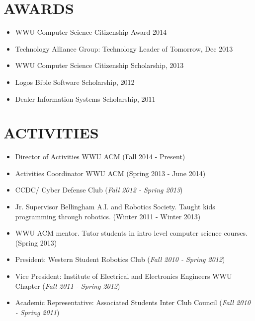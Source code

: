 \documentclass[line,margin]{res}
\begin{document}
\begin{resume}
\section{AWARDS}
	\begin{itemize} \itemsep -1pt
		\item WWU Computer Science Citizenship Award 2014
		\item Technology Alliance Group: Technology Leader of Tomorrow, Dec 2013
		\item WWU Computer Science Citizenship Scholarship, 2013
		\item Logos Bible Software Scholarship, 2012
		\item Dealer Information Systems Scholarship, 2011
	\end{itemize}

\section{ACTIVITIES} 
	\begin{itemize} \itemsep -1pt
	\item Director of Activities WWU ACM (Fall 2014 - Present)
	\item Activities Coordinator WWU ACM (Spring 2013 - June 2014)
	\item CCDC/ Cyber Defense Club ({\sl Fall 2012 - Spring 2013})
	\item Jr. Supervisor Bellingham A.I. and Robotics Society.  Taught kids programming through robotics. (Winter 2011 - Winter 2013)
	\item WWU ACM mentor.  Tutor students in intro level computer science courses. (Spring 2013)
	\item President: Western Student Robotics Club ({\sl Fall 2010 - Spring 2012})
 	\item Vice President: Institute of Electrical and Electronics Engineers WWU Chapter ({\sl Fall 2011 - Spring 2012})
	\item Academic Representative: Associated Students Inter Club Council ({\sl Fall 2010 - Spring 2011})
	\end{itemize}
\end{resume}
\end{document}
